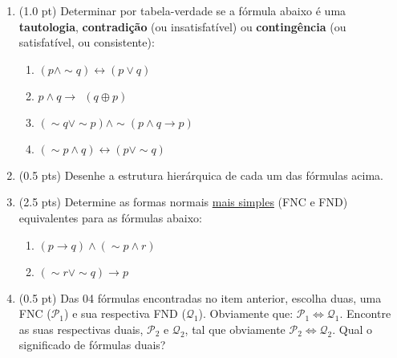 \documentclass[12pt]{article}
\begin{document}
\begin{enumerate}
\itemsep 15pt
\item (1.0 pt) Determinar por tabela-verdade se a fórmula abaixo é uma {\bf tautologia}, {\bf contradição} (ou insatisfatível) ou {\bf contingência} (ou satisfatível, ou consistente): 

\begin{enumerate}
\setlength{\itemsep}{-2pt}
\item $(p \wedge \sim q) \leftrightarrow  (p \vee q) $

\item $p \wedge q \rightarrow ~~(q \oplus p)$

\item $ (\sim q \vee \sim p) \wedge \sim (p \wedge q \rightarrow p) $ 

\item $(\sim p \wedge q) \leftrightarrow ( p \vee \sim q)$ 

\end{enumerate}

\item (0.5 pts) Desenhe a estrutura hierárquica de cada um das fórmulas acima.


\item (2.5 pts) Determine as formas normais \underline{mais simples} (FNC e FND) equivalentes para as fórmulas abaixo: 
\begin{enumerate}
\setlength{\itemsep}{-2pt}

\item $(p \rightarrow q)  \wedge 
 (\sim p \wedge r) $


\item $(\sim r \vee \sim q) \rightarrow p $


\end{enumerate}

\item (0.5 pt) Das 04 fórmulas
encontradas no item anterior, escolha duas, uma 
FNC ($\mathcal{P}_1$) e sua respectiva FND ($\mathcal{Q}_1$). Obviamente que: $\mathcal{P}_1 \Leftrightarrow \mathcal{Q}_1$. 
Encontre as suas respectivas duais, $\mathcal{P}_2$ e $\mathcal{Q}_2$,  tal que obviamente  $\mathcal{P}_2 \Leftrightarrow \mathcal{Q}_2$. Qual o significado de fórmulas duais?



\end{enumerate}
\end{document}

